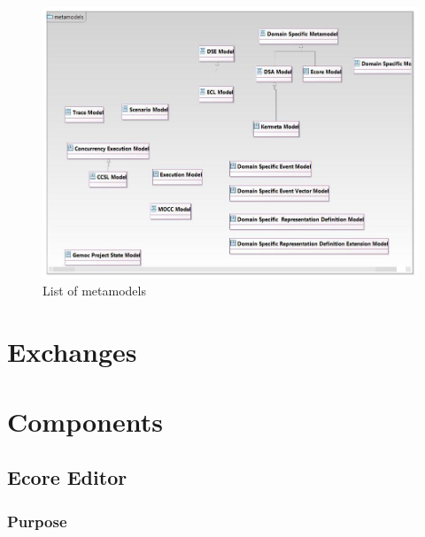 \documentclass{gemoc} %
\begin{document}
\begin{figure}[bt]
	\begin{center}
	\includegraphics*[trim=0.0cm 0.0cm 0cm 0.0cm, clip=true, width=1.0\linewidth]{../images/Gemoc Metamodels Class Diagram.jpg}
	\caption{List of metamodels}
	\label{fig:MetamodelList}
	\end{center}
\end{figure}

\section{Exchanges}


\section{Components}

\subsection{Ecore Editor}


\subsubsection{Purpose}

\end{document}
